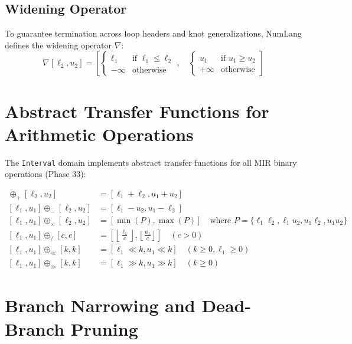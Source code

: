 \subsection{Widening Operator}
To guarantee termination across loop headers and knot generalizations, NumLang defines the widening operator $\nabla$:
\begin{equation}
[\ell_1, u_1] \nabla [\ell_2, u_2] = \left[
\begin{cases}
\ell_1 & \text{if } \ell_1 \le \ell_2 \\
-\infty & \text{otherwise}
\end{cases}, \quad
\begin{cases}
u_1 & \text{if } u_1 \ge u_2 \\
+\infty & \text{otherwise}
\end{cases}
\right]
\end{equation}

\section{Abstract Transfer Functions for Arithmetic Operations}
\label{sec:refinements:transfer}

The \texttt{Interval} domain implements abstract transfer functions for all MIR binary operations (Phase 33):

\begin{align}
[\ell_1, u_1] \oplus_+ [\ell_2, u_2] &= [\ell_1 + \ell_2, u_1 + u_2] \\[0.6em]
[\ell_1, u_1] \oplus_- [\ell_2, u_2] &= [\ell_1 - u_2, u_1 - \ell_2] \\[0.6em]
[\ell_1, u_1] \oplus_\times [\ell_2, u_2] &= [\min(P), \max(P)] \quad \text{where } P = \{\ell_1 \ell_2, \ell_1 u_2, u_1 \ell_2, u_1 u_2\} \\[0.6em]
[\ell_1, u_1] \oplus_{/\!} [c, c] &= \left[\left\lfloor \frac{\ell_1}{c} \right\rfloor, \left\lfloor \frac{u_1}{c} \right\rfloor\right] \quad (c > 0) \\[0.6em]
[\ell_1, u_1] \oplus_{\ll} [k, k] &= [\ell_1 \ll k, u_1 \ll k] \quad (k \ge 0, \ell_1 \ge 0) \\[0.6em]
[\ell_1, u_1] \oplus_{\gg} [k, k] &= [\ell_1 \gg k, u_1 \gg k] \quad (k \ge 0)
\end{align}

\section{Branch Narrowing and Dead-Branch Pruning}
\label{sec:refinements:narrowing}

